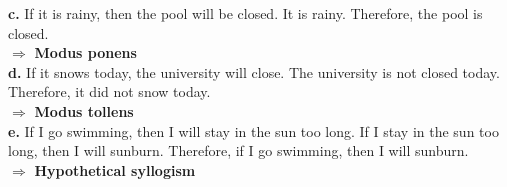 \documentclass[10pt]{article}
\begin{document}
    \textbf{c.} If it is rainy, then the pool will be closed. It is rainy.
    Therefore, the pool is closed. \\
        $\Rightarrow$ \textbf{Modus ponens} \\


    \textbf{d.} If it snows today, the university will close. The university is not
    closed today. Therefore, it did not snow today. \\
        $\Rightarrow$ \textbf{Modus tollens} \\

    \textbf{e.} If I go swimming, then I will stay in the sun too long. If I stay in
    the sun too long, then I will sunburn. Therefore, if I go swimming, then I will sunburn. \\
        $\Rightarrow$ \textbf{Hypothetical syllogism} \\
\end{document}

